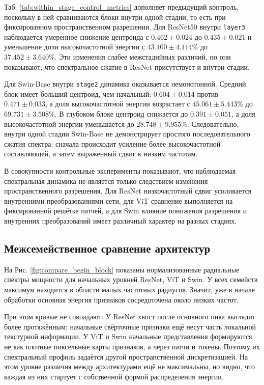 Таб. \ref{tab:within_stage_control_metrics} дополняет предыдущий контроль, поскольку в ней сравниваются блоки внутри одной стадии, то есть при фиксированном пространственном разрешении. Для ResNet50 внутри \texttt{layer3} наблюдается умеренное снижение центроида с $0.462 \pm 0.024$ до $0.435 \pm 0.021$ и уменьшение доли высокочастотной энергии с $43.100 \pm 4.114\%$ до $37.452 \pm 3.640\%$. Эти изменения слабее межстадийных различий, но они показывают, что спектральное сжатие в ResNet присутствует и внутри стадии.

Для Swin-Base внутри \texttt{stage2} динамика оказывается немонотонной. Средний блок имеет больший центроид, чем начальный: $0.604 \pm 0.014$ против $0.471 \pm 0.033$, а доля высокочастотной энергии возрастает с $45.061 \pm 5.443\%$ до $69.731 \pm 3.508\%$. В глубоком блоке центроид снижается до $0.391 \pm 0.051$, а доля высокочастотной энергии уменьшается до $28.748 \pm 9.955\%$. Следовательно, внутри одной стадии Swin-Base не демонстрирует простого последовательного сжатия спектра: сначала происходит усиление более высокочастотной составляющей, а затем выраженный сдвиг к низким частотам.

В совокупности контрольные эксперименты показывают, что наблюдаемая спектральная динамика не является только следствием изменения пространственного разрешения. Для ResNet низкочастотный сдвиг усиливается внутренними преобразованиями сети, для ViT сравнение выполняется на фиксированной решётке патчей, а для Swin влияние понижения разрешения и внутренних преобразований имеет различный характер на разных стадиях.

\subsection{Межсемейственное сравнение архитектур}

На Рис. \ref{fig:compare_begin_block} показаны нормализованные радиальные спектры мощности для начальных уровней ResNet, ViT и Swin. У всех семейств максимум находится в области малых частотных радиусов. Значит, уже в начале обработки основная энергия признаков сосредоточена около низких частот.

При этом кривые не совпадают. У ResNet хвост после основного пика выглядит более протяжённым: начальные свёрточные признаки ещё несут часть локальной текстурной информации. У ViT и Swin начальные представления формируются не как плотные пиксельные карты признаков, а через патчи и токены. Поэтому их спектральный профиль задаётся другой пространственной дискретизацией. На этом уровне различия между архитектурами ещё не максимальны, но видно, что каждая из них стартует с собственной формой распределения энергии.

